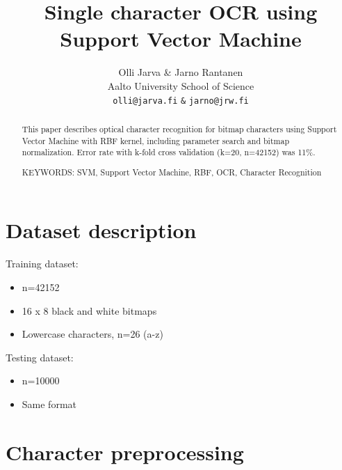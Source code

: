 \documentclass{netsec2012}
\begin{document}

\title{Single character OCR using Support Vector Machine}

\author{Olli Jarva \& Jarno Rantanen \\
        Aalto University School of Science \\
	\texttt{olli@jarva.fi} \texttt{\&} \texttt{jarno@jrw.fi}}
\maketitle


\begin{abstract}
  This paper describes optical character recognition for bitmap characters
  using Support Vector Machine with RBF kernel, including parameter search
  and bitmap normalization. 
  Error rate with k-fold cross validation (k=20, n=42152) was 11\%.

\vspace{3mm}
\noindent KEYWORDS: SVM, Support Vector Machine, RBF, OCR, Character Recognition

\end{abstract}


\section{Dataset description}

Training dataset:

\begin{itemize}
\item n=42152
\item 16 x 8 black and white bitmaps
\item Lowercase characters, n=26 (a-z)
\end{itemize}

Testing dataset:

\begin{itemize}
\item n=10000
\item Same format
\end{itemize}

\section{Character preprocessing}
\end{document}
